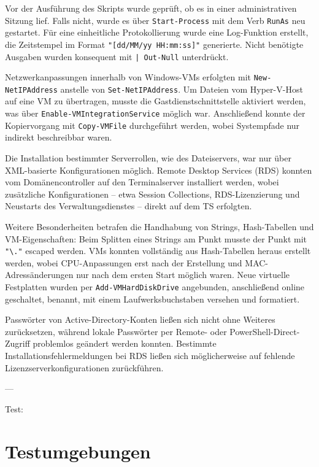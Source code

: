 \documentclass[conference]{IEEEtran}
\begin{document}
Vor der Ausführung des Skripts wurde geprüft, ob es in einer administrativen Sitzung lief. Falls nicht, wurde es über \texttt{Start-Process} mit dem Verb \texttt{RunAs} neu gestartet. Für eine einheitliche Protokollierung wurde eine Log-Funktion erstellt, die Zeitstempel im Format \texttt{"[dd/MM/yy HH:mm:ss]"} generierte. Nicht benötigte Ausgaben wurden konsequent mit \texttt{| Out-Null} unterdrückt.  

Netzwerkanpassungen innerhalb von Windows-VMs erfolgten mit \texttt{New-NetIPAddress} anstelle von \texttt{Set-NetIPAddress}. Um Dateien vom Hyper-V-Host auf eine VM zu übertragen, musste die Gastdienstschnittstelle aktiviert werden, was über \texttt{Enable-VMIntegrationService} möglich war. Anschließend konnte der Kopiervorgang mit \texttt{Copy-VMFile} durchgeführt werden, wobei Systempfade nur indirekt beschreibbar waren.  

Die Installation bestimmter Serverrollen, wie des Dateiservers, war nur über XML-basierte Konfigurationen möglich. Remote Desktop Services (RDS) konnten vom Domänencontroller auf den Terminalserver installiert werden, wobei zusätzliche Konfigurationen -- etwa Session Collections, RDS-Lizenzierung und Neustarts des Verwaltungsdienstes -- direkt auf dem TS erfolgten.  

Weitere Besonderheiten betrafen die Handhabung von Strings, Hash-Tabellen und VM-Eigenschaften: Beim Splitten eines Strings am Punkt musste der Punkt mit \texttt{"\textbackslash."} escaped werden. VMs konnten vollständig aus Hash-Tabellen heraus erstellt werden, wobei CPU-Anpassungen erst nach der Erstellung und MAC-Adressänderungen nur nach dem ersten Start möglich waren. Neue virtuelle Festplatten wurden per \texttt{Add-VMHardDiskDrive} angebunden, anschließend online geschaltet, benannt, mit einem Laufwerksbuchstaben versehen und formatiert.  

Passwörter von Active-Directory-Konten ließen sich nicht ohne Weiteres zurücksetzen, während lokale Passwörter per Remote- oder PowerShell-Direct-Zugriff problemlos geändert werden konnten. Bestimmte Installationsfehlermeldungen bei RDS ließen sich möglicherweise auf fehlende Lizenzserverkonfigurationen zurückführen.

---

Test:

\chapter{Testumgebungen}
\end{document}
